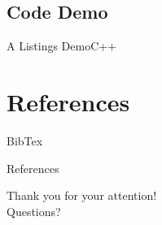 \documentclass{article}
\begin{document}
\subsection{Code Demo}
\begin{frame}{A Listings Demo}{C++}
	\lstI
\end{frame}

\section{References}

\begin{frame}{BibTex }
     \cite{9492070} 
\end{frame}

\begin{frame}{References}



\end{frame}
\begin{frame}[plain]
	\vfill
	\centering
	{
		\centering \Huge \color{white} Thank you for your attention!\\[10pt]Questions?
	}
	\vfill
\end{frame}
\end{document}

